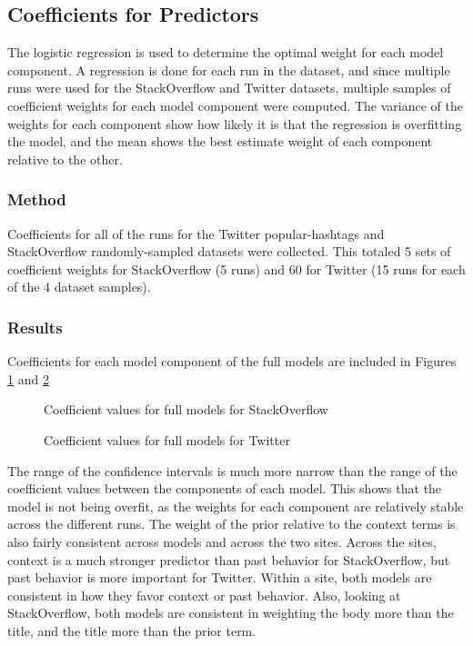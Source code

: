 \documentclass[man,floatsintext,donotrepeattitle]{apa6}
\begin{document}
\subsection{Coefficients for Predictors}

The logistic regression is used to determine the optimal weight for each model component.
A regression is done for each run in the dataset, and since multiple runs were used for the StackOverflow and Twitter datasets, multiple samples of coefficient weights for each model component were computed.
The variance of the weights for each component show how likely it is that the regression is overfitting the model,
and the mean shows the best estimate weight of each component relative to the other.

\subsubsection{Method}

Coefficients for all of the runs for the Twitter popular-hashtags and StackOverflow randomly-sampled datasets were collected.
This totaled 5 sets of coefficient weights for StackOverflow (5 runs) and 60 for Twitter (15 runs for each of the 4 dataset samples).

\subsubsection{Results}

Coefficients for each model component of the full models are included in Figures \ref{figContextCoeffSO} and \ref{figContextCoeffT}

\begin{figure}[!htbp]
  \caption{Coefficient values for full models for StackOverflow}
  \label{figContextCoeffSO}
\end{figure}

\begin{figure}[!htbp]
  \caption{Coefficient values for full models for Twitter}
  \label{figContextCoeffT}
\end{figure}

The range of the confidence intervals is much more narrow than the range of the coefficient values between the components of each model.
This shows that the model is not being overfit, as the weights for each component are relatively stable across the different runs.
The weight of the prior relative to the context terms is also fairly consistent across models and across the two sites.
Across the sites, context is a much stronger predictor than past behavior for StackOverflow, but past behavior is more important for Twitter. 
Within a site, both models are consistent in how they favor context or past behavior.
Also, looking at StackOverflow, both models are consistent in weighting the body more than the title, and the title more than the prior term.
\end{document}
